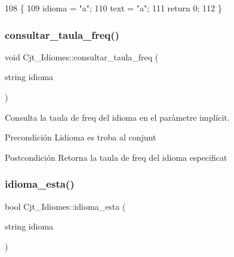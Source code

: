 \begin{DoxyCode}
108                                                           \{
109     idioma = \textcolor{stringliteral}{"a"};
110     text = \textcolor{stringliteral}{"a"};
111     \textcolor{keywordflow}{return} 0;
112 \}
\end{DoxyCode}
\mbox{\label{class_cjt___idiomes_af0cfe6e69c1784af172fe825bdbe61f8}} 
\subsubsection{\texorpdfstring{consultar\+\_\+taula\+\_\+freq()}{consultar\_taula\_freq()}}
{\footnotesize\ttfamily void Cjt\+\_\+\+Idiomes\+::consultar\+\_\+taula\+\_\+freq (\begin{DoxyParamCaption}\item[{string}]{idioma }\end{DoxyParamCaption})}



Consulta la taula de freq del idioma en el paràmetre implícit. 

\begin{DoxyPrecond}{Precondición}
L\textquotesingle{}idioma es troba al conjunt 
\end{DoxyPrecond}
\begin{DoxyPostcond}{Postcondición}
Retorna la taula de freq del idioma especificat 
\end{DoxyPostcond}
\mbox{\label{class_cjt___idiomes_a4c46be5ecf3b12b3f481ace7d487fdc3}} 
\subsubsection{\texorpdfstring{idioma\+\_\+esta()}{idioma\_esta()}}
{\footnotesize\ttfamily bool Cjt\+\_\+\+Idiomes\+::idioma\+\_\+esta (\begin{DoxyParamCaption}\item[{string}]{idioma }\end{DoxyParamCaption})}



